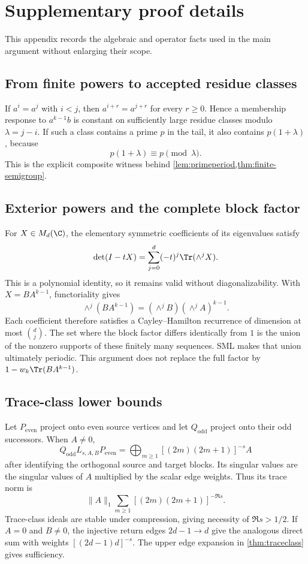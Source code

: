 \section{Supplementary proof details}
\label{app:proofs}

This appendix records the algebraic and operator facts used in the main
argument without enlarging their scope.

\subsection{From finite powers to accepted residue classes}

If $a^i=a^j$ with $i<j$, then
$a^{i+r}=a^{j+r}$ for every $r\ge0$.  Hence a membership response to
$a^{k-1}b$ is constant on sufficiently large residue classes modulo
$\lambda=j-i$.  If such a class contains a prime $p$ in the tail, it also
contains $p(1+\lambda)$, because
\[
        p(1+\lambda)\equiv p\pmod\lambda.
\]
This is the explicit composite witness behind
\cref{lem:primeperiod,thm:finite-semigroup}.

\subsection{Exterior powers and the complete block factor}

For $X\in M_d(\C)$, the elementary symmetric coefficients of its
eigenvalues satisfy
\[
 \det(I-tX)=\sum_{j=0}^d(-t)^j\Tr(\wedge^jX).
\]
This is a polynomial identity, so it remains valid without diagonalizability.
With $X=BA^{k-1}$, functoriality gives
\[
 \wedge^j(BA^{k-1})
 = (\wedge^jB)(\wedge^jA)^{k-1}.
\]
Each coefficient therefore satisfies a Cayley--Hamilton recurrence of
dimension at most $\binom dj$.  The set where the block factor differs
identically from $1$ is the union of the nonzero supports of these finitely
many sequences.  SML makes that union ultimately periodic.  This argument
does not replace the full factor by $1-w_k\Tr(BA^{k-1})$.

\subsection{Trace-class lower bounds}

Let $P_{\mathrm{even}}$ project onto even source vertices and let
$Q_{\mathrm{odd}}$ project onto their odd successors.  When $A\ne0$,
\[
 Q_{\mathrm{odd}}L_{s,A,B}P_{\mathrm{even}}
 =\bigoplus_{m\ge1}[(2m)(2m+1)]^{-s}A
\]
after identifying the orthogonal source and target blocks.  Its singular
values are the singular values of $A$ multiplied by the scalar edge
weights.  Thus its trace norm is
\[
 \|A\|_1\sum_{m\ge1}[(2m)(2m+1)]^{-\Re s}.
\]
Trace-class ideals are stable under compression, giving necessity of
$\Re s>1/2$.  If $A=0$ and $B\ne0$, the injective return edges
$2d-1\to d$ give the analogous direct sum with weights
$[(2d-1)d]^{-s}$.  The upper edge expansion in
\cref{thm:traceclass} gives sufficiency.

